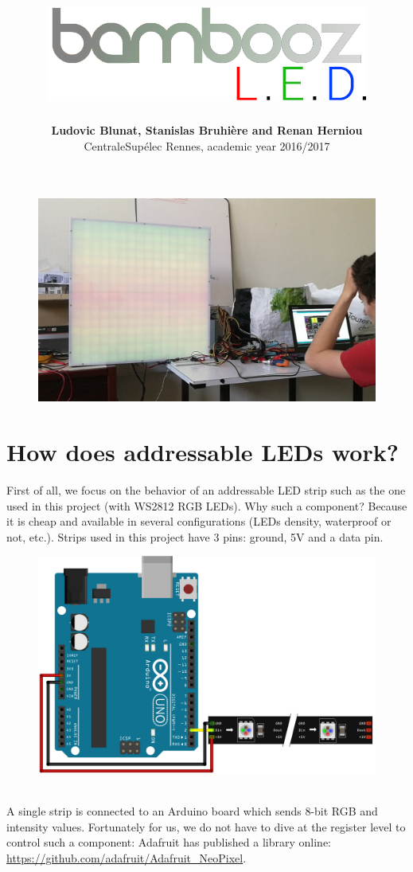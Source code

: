 \documentclass[a4paper,12pt]{article}
\title{\vspace{-3em}%
	\includegraphics[width=.75\textwidth]{img/bamboozled2}}
\author{\textbf{Ludovic Blunat, Stanislas Bruhière and Renan Herniou}\\CentraleSupélec Rennes, academic year 2016/2017}
\date{}
\begin{document}
\maketitle
\begin{figure}[htbp]
	\centering
	\includegraphics[width=\textwidth]{img/cover}
\end{figure}\newpage
\section{How does addressable LEDs work?}
First of all, we focus on the behavior of an addressable LED strip such as the one used in this project (with WS2812 RGB LEDs). Why such a component? Because it is cheap and available in several configurations (LEDs density, waterproof or not, etc.). Strips used in this project \cite{led} have 3 pins: ground, 5V and a data pin.
\begin{figure}[htbp]
\centering
\includegraphics[height=.3\textheight]{img/led_strip}
\end{figure}\\
A single strip is connected to an Arduino board which sends 8-bit RGB and intensity values. Fortunately for us, we do not have to dive at the register level to control such a component: Adafruit has published a library online: \url{https://github.com/adafruit/Adafruit_NeoPixel}.\\
\end{document}
